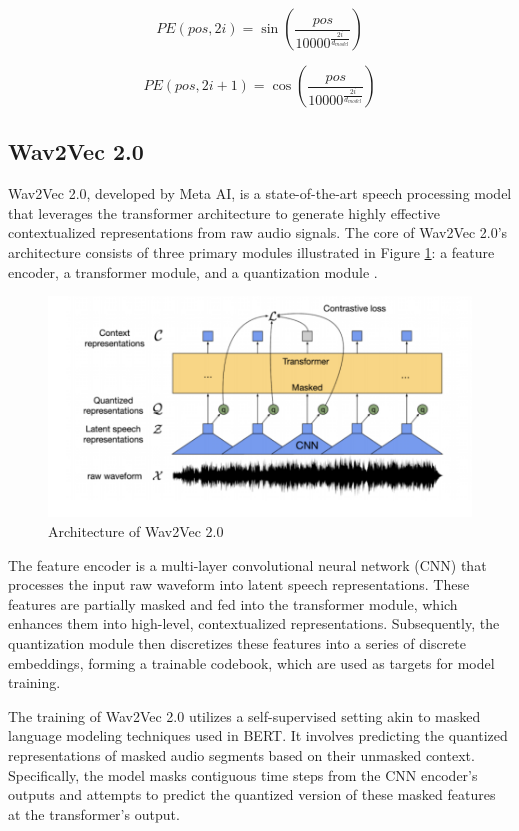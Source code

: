 \documentclass[a4paper,12pt]{article}
\begin{document}
\begin{equation}
    PE(pos, 2i) = \sin \left( \frac{pos}{10000^{\frac{2i}{d_{model}}}} \right)
\end{equation}

\begin{equation}
    PE(pos, 2i + 1) = \cos \left( \frac{pos}{10000^{\frac{2i}{d_{model}}}} \right)
\end{equation}

\subsection{Wav2Vec 2.0}

Wav2Vec 2.0, developed by Meta AI, is a state-of-the-art speech processing model that leverages the transformer architecture to generate highly effective contextualized representations from raw audio signals. The core of Wav2Vec 2.0’s architecture consists of three primary modules illustrated in Figure \ref{fig:architecture_Wav2Vec2}: a feature encoder, a transformer module, and a quantization module .

\begin{figure}[H]
    \centering
    \includegraphics[width=0.5\linewidth]{architecture_Wav2Vec2.png}
    \caption{Architecture of Wav2Vec 2.0}
    \label{fig:architecture_Wav2Vec2}
\end{figure}

The feature encoder is a multi-layer convolutional neural network (CNN) that processes the input raw waveform into latent speech representations. These features are partially masked and fed into the transformer module, which enhances them into high-level, contextualized representations. Subsequently, the quantization module then discretizes these features into a series of discrete embeddings, forming a trainable codebook, which are used as targets for model training.

The training of Wav2Vec 2.0 utilizes a self-supervised setting akin to masked language modeling techniques used in BERT. It involves predicting the quantized representations of masked audio segments based on their unmasked context. Specifically, the model masks contiguous time steps from the CNN encoder’s outputs and attempts to predict the quantized version of these masked features at the transformer’s output. 
\end{document}
